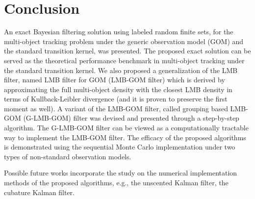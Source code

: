 \documentclass[journal]{IEEEtran}
\begin{document}
{\section{Conclusion}\label{chp:8}
An exact  Bayesian filtering solution using labeled random finite sets, for the multi-object tracking problem under the generic observation model (GOM) and the  standard transition kernel, was presented. 
The proposed exact solution can be served as the theoretical performance benchmark in multi-object tracking under the standard transition kernel.  We also proposed a generalization of the  LMB filter, named LMB filter for GOM (LMB-GOM filter) which is derived by approximating the full multi-object density with the closest  LMB density  in terms of Kullback-Leibler divergence (and it is proven to preserve the first moment  as well). A variant of the LMB-GOM filter, called grouping based LMB-GOM (G-LMB-GOM) filter was devised    and presented through a step-by-step algorithm.  The G-LMB-GOM filter can be viewed as a computationally tractable way to implement the LMB-GOM filter. The efficacy of the proposed algorithms is demonstrated using the sequential Monte Carlo implementation  under  two types of   non-standard observation models. 

Possible future works  incorporate the study on the numerical implementation methods of the proposed algorithms, e.g., the unscented  Kalman filter, the cubature Kalman filter.
\appendices
}
\end{document}
